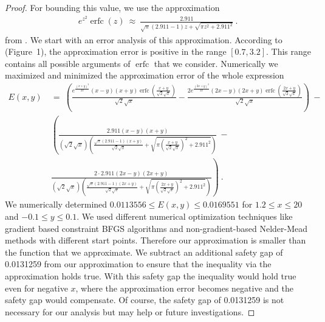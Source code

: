 \documentclass{article}
\renewcommand{\leq}{\leqslant}
\DeclareMathOperator{\erfc}{erfc}
\begin{document}
\begin{proof}
For bounding this value, we use the approximation 
\begin{align}
\label{eq:ren}
e^{z^2} \erfc (z) \ \approx \ \frac{2.911}{\sqrt{\pi } (2.911 -1)
  z+\sqrt{\pi  z^2+2.911^2}} \ .
\end{align}
from \citet{Ren:07}.
We start with an error analysis of this approximation.
According to \citet{Ren:07} (Figure~1), the approximation 
error is positive in the range
$[0.7,3.2]$.  This range contains all possible
arguments of $\erfc$ that we consider.
Numerically we maximized and minimized the approximation error of the
whole expression
\begin{align}
E(x,y) \ &= \ \left(\frac{e^{\frac{(x+y)^2}{2 x}} (x-y) (x+y)
  \erfc \left(\frac{x+y}{\sqrt{2} \sqrt{x}}\right)}{\sqrt{2}
  \sqrt{x}}-\frac{2 e^{\frac{(2 x+y)^2}{2 x}} (2 x-y) (2 x+y)
  \erfc \left(\frac{2 x+y}{\sqrt{2} \sqrt{x}}\right)}{\sqrt{2}
  \sqrt{x}}\right) \ - \\ \nonumber 
&\left(\frac{2.911 (x-y) (x+y)}{\left(\sqrt{2} \sqrt{x}\right) \left(\frac{\sqrt{\pi } (2.911 -1) 
  (x+y)}{\sqrt{2} \sqrt{x}}+\sqrt{\pi  \left(\frac{x+y}{\sqrt{2} \sqrt{x}}\right)^2+2.911^2}\right)}\ - \right. \\ \nonumber 
&\left. \frac{2 \cdot 2.911 (2 x-y) (2 x+y)}{\left(\sqrt{2} \sqrt{x}\right) \left(\frac{\sqrt{\pi } (2.911 -1) (2 x+y)}{\sqrt{2} \sqrt{x}}+
  \sqrt{\pi  \left(\frac{2 x+y}{\sqrt{2} \sqrt{x}}\right)^2+2.911^2}\right)}\right) \ .
\end{align}
We numerically determined $0.0113556 \leq E(x,y) \leq 0.0169551$ for 
$1.2 \leq x \leq 20$ and $-0.1 \leq y \leq 0.1$. 
We used different numerical optimization techniques like  
gradient based constraint BFGS algorithms and 
non-gradient-based Nelder-Mead methods with different start points.
Therefore our approximation is smaller than the function that we
approximate. 
We subtract an additional safety gap of 0.0131259 from our
approximation to ensure that the inequality via the approximation
holds true. With this safety gap the inequality would hold true even 
for negative $x$, where the approximation error becomes negative and
the safety gap would compensate.
Of course, the safety gap of 0.0131259 is not necessary for our
analysis but may help or future investigations.


\end{proof}
\end{document}
